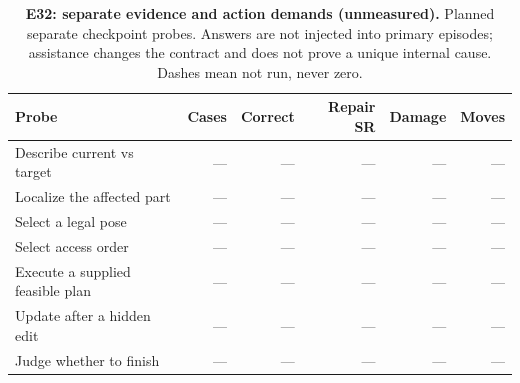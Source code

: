 \begin{table}[!ht]
\centering\small
\caption{\textbf{E32: separate evidence and action demands (unmeasured).} Planned separate checkpoint probes. Answers are not injected into primary episodes; assistance changes the contract and does not prove a unique internal cause. Dashes mean not run, never zero.}
\begin{tabularx}{\textwidth}{@{}Xrrrrr@{}}\toprule
Probe & Cases & Correct & Repair SR & Damage & Moves\\\midrule
Describe current vs target & --- & --- & --- & --- & ---\\
Localize the affected part & --- & --- & --- & --- & ---\\
Select a legal pose & --- & --- & --- & --- & ---\\
Select access order & --- & --- & --- & --- & ---\\
Execute a supplied feasible plan & --- & --- & --- & --- & ---\\
Update after a hidden edit & --- & --- & --- & --- & ---\\
Judge whether to finish & --- & --- & --- & --- & ---\\
\bottomrule
\end{tabularx}
\end{table}
